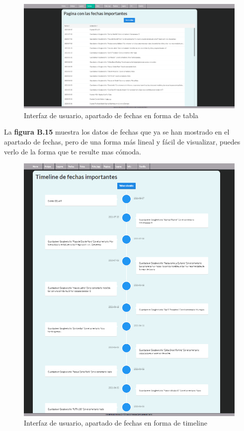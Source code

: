 \begin{figure}
	\begin{center}
		\includegraphics[scale=0.3]{Imagenes/Fuentes/InterfazFechas.png} \caption{Interfaz de usuario, apartado de fechas en forma de tabla}
		\label{WebAplication5}
	\end{center}
\end{figure}

La \textbf{figura B.15} muestra los datos de fechas que ya se han mostrado en el apartado de fechas, pero de una forma más lineal y fácil de visualizar, puedes verlo de la forma que te resulte mas cómoda.

\begin{figure}
	\begin{center}
		\includegraphics[scale=0.5]{Imagenes/Fuentes/InterfazTimeline.png} \caption{Interfaz de usuario, apartado de fechas en forma de timeline}
		\label{WebAplication11}
	\end{center}
\end{figure}


